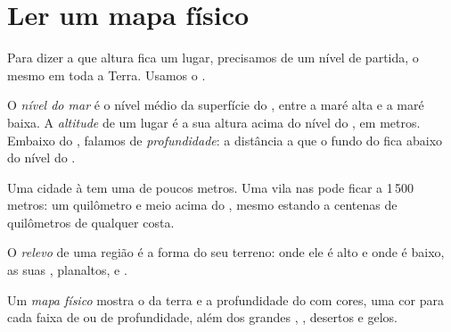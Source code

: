 \section{Ler um mapa físico}

Para dizer a que altura fica um lugar, precisamos de um nível de partida,
o mesmo em toda a Terra. Usamos o .

\begin{definition}\label{def:g4:world-physical-map:altitude}
O \emph{nível do mar} é o nível médio da superfície do
, entre a maré alta e a maré baixa. A \emph{altitude} de
um lugar é a sua altura acima do nível do , em metros. Embaixo do ,
falamos de \emph{profundidade}: a distância a que o fundo do  fica
abaixo do nível do .
\end{definition}

Uma cidade à  tem uma  de poucos metros. Uma vila nas
 pode ficar a 1\,500 metros: um quilômetro e meio acima do , mesmo estando a centenas de quilômetros de qualquer costa.

\begin{definition}[Relevo]\label{def:g4:world-physical-map:relief}
O \emph{relevo} de uma região é a forma do seu terreno: onde
ele é alto e onde é baixo, as suas , planaltos,  e
.
\end{definition}

\begin{definition}\label{def:g4:world-physical-map:physical-map}
Um \emph{mapa físico} mostra o  da terra e a
profundidade do  com cores, uma cor para cada faixa de  ou de
profundidade, além dos grandes , , desertos e gelos.
\end{definition}

